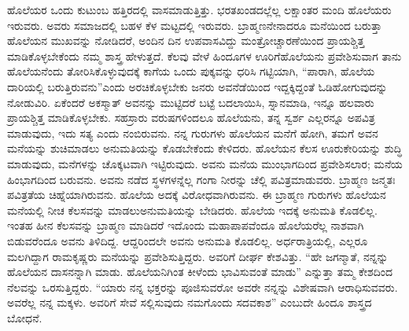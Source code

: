 ಹೊಲೆಯರ ಒಂದು ಕುಟುಂಬ ಹತ್ತಿರದಲ್ಲಿ ವಾಸಮಾಡುತ್ತಿತ್ತು. ಭರತಖಂಡದಲ್ಲೆಲ್ಲ ಲಕ್ಷಾಂತರ ಮಂದಿ ಹೊಲೆಯರು ಇರುವರು. ಅವರು ಸಮಾಜದಲ್ಲಿ ಬಹಳ ಕೆಳ ಮಟ್ಟದಲ್ಲಿ ಇರುವರು. ಬ್ರಾಹ್ಮಣನೇನಾದರೂ ಮನೆಯಿಂದ ಬರುತ್ತಾ ಹೊಲೆಯನ ಮುಖವನ್ನು ನೋಡಿದರೆ, ಅಂದಿನ ದಿನ ಉಪವಾಸವಿದ್ದು ಮಂತ್ರೋಚ್ಚಾರಣೆಯಿಂದ ಪ್ರಾಯಶ್ಚಿತ್ತ ಮಾಡಿಕೊಳ್ಳಬೇಕೆಂದು ನಮ್ಮ ಶಾಸ್ತ್ರ ಹೇಳುತ್ತದೆ. ಕೆಲವು ವೇಳೆ ಹಿಂದೂಗಳ ಊರಿಗೆ\break ಹೊಲೆಯನು ಪ್ರವೇಶಿಸುವಾಗ ತಾನು ಹೊಲೆಯನೆಂದು ತೋರಿಸಿಕೊಳ್ಳುವುದಕ್ಕೆ ಕಾಗೆಯ ಒಂದು ಪುಕ್ಕವನ್ನು ಧರಿಸಿ ಗಟ್ಟಿಯಾಗಿ, “ಪಾರಾಗಿ, ಹೊಲೆಯ ದಾರಿಯಲ್ಲಿ ಬರುತ್ತಿರುವನು”\break ಎಂದು ಅರಚಿಕೊಳ್ಳಬೇಕು ಜನರು ಅವನೆಡೆಯಿಂದ ಇದ್ದಕ್ಕಿದ್ದಂತೆ ಓಡಿಹೋಗುವುದನ್ನು ನೋಡುವಿರಿ. ಏಕೆಂದರೆ ಅಕಸ್ಮಾತ್​ ಅವನನ್ನು ಮುಟ್ಟಿದರೆ ಬಟ್ಟೆ ಬದಲಾಯಿಸಿ, ಸ್ನಾನಮಾಡಿ, ಇನ್ನೂ ಹಲವಾರು ಪ್ರಾಯಶ್ಚಿತ್ತ ಮಾಡಿಕೊಳ್ಳಬೇಕು. ಸಹಸ್ರಾರು ವರುಷಗಳಿಂದಲೂ ಹೊಲೆಯನು, ತನ್ನ ಸ್ವರ್ಶ ಎಲ್ಲರನ್ನೂ ಅಪವಿತ್ರ ಮಾಡುವುದು, ಇದು ಸತ್ಯ ಎಂದು ನಂಬಿರುವನು. ನನ್ನ ಗುರುಗಳು ಹೊಲೆಯನ ಮನೆಗೆ ಹೋಗಿ, ತಮಗೆ ಅವನ ಮನೆಯನ್ನು ಶುಚಿಮಾಡಲು ಅನುಮತಿಯನ್ನು ಕೊಡಬೇಕೆಂದು ಕೇಳಿದರು. ಹೊಲೆಯನ ಕೆಲಸ ಊರುಕೇರಿಯನ್ನು ಶುದ್ಧಿ ಮಾಡುವುದು, ಮನೆಗಳನ್ನು ಚೊಕ್ಕಟವಾಗಿ ಇಟ್ಟಿರುವುದು. ಅವನು ಮನೆಯ ಮುಂಭಾಗದಿಂದ ಪ್ರವೇಶಿಸಲಾರ; ಮನೆಯ ಹಿಂಭಾಗದಿಂದ ಬರುವನು. ಅವನು ನಡೆದ ಸ್ಥಳಗಳನ್ನೆಲ್ಲ ಗಂಗಾ ನೀರನ್ನು ಚೆಲ್ಲಿ ಪವಿತ್ರಮಾಡುವರು. ಬ್ರಾಹ್ಮಣ ಜನ್ಮತಃ ಪವಿತ್ರತೆಯ ಚಿಹ್ನೆಯಾಗಿರುವನು. ಹೊಲೆಯ ಅದಕ್ಕೆ ವಿರೋಧವಾಗಿರುವನು. ಈ ಬ್ರಾಹ್ಮಣ ಗುರುಗಳು ಹೊಲೆಯನ ಮನೆಯಲ್ಲಿ ನೀಚ ಕೆಲಸವನ್ನು ಮಾಡಲು\break ಅನುಮತಿಯನ್ನು ಬೇಡಿದರು. ಹೊಲೆಯ ಇದಕ್ಕೆ ಅನುಮತಿ ಕೊಡಲಿಲ್ಲ. ಇಂತಹ ಹೀನ ಕೆಲಸವನ್ನು ಬ್ರಾಹ್ಮಣ ಮಾಡಿದರೆ ಇದೊಂದು ಮಹಾಪಾಪವೆಂದೂ ಹೊಲೆಯರೆಲ್ಲ ನಾಶವಾಗಿ ಬಿಡುವರೆಂದೂ ಅವನು ತಿಳಿದಿದ್ದ. ಆದ್ದರಿಂದಲೇ ಅವನು ಅನುಮತಿ ಕೊಡಲಿಲ್ಲ. ಅರ್ಧರಾತ್ರಿಯಲ್ಲಿ, ಎಲ್ಲರೂ ಮಲಗಿದ್ದಾಗ ರಾಮಕೃಷ್ಣರು ಮನೆಯನ್ನು ಪ್ರವೇಶಿಸುತ್ತಿದ್ದರು. ಅವರಿಗೆ ದೀರ್ಘ ಕೇಶವಿತ್ತು. “ಹೇ ಜಗನ್ಮಾತೆ, ನನ್ನನ್ನು ಹೊಲೆಯನ ದಾಸನನ್ನಾಗಿ ಮಾಡು. ಹೊಲೆಯನಿಗಿಂತ ಕೀಳೆಂದು ಭಾವಿಸುವಂತೆ ಮಾಡು” ಎನ್ನುತ್ತಾ ತಮ್ಮ ಕೇಶದಿಂದ ನೆಲವನ್ನು ಒರಸುತ್ತಿದ್ದರು. “ಯಾರು ನನ್ನ ಭಕ್ತರನ್ನು ಪೂಜಿಸುವರೋ ಅವರೇ ನನ್ನನ್ನು ವಿಶೇಷವಾಗಿ ಆರಾಧಿಸುವವರು. ಅವರೆಲ್ಲ ನನ್ನ ಮಕ್ಕಳು. ಅವರಿಗೆ ಸೇವೆ ಸಲ್ಲಿಸುವುದು ನಮಗೊಂದು ಸದವಕಾಶ” ಎಂಬುದೇ ಹಿಂದೂ ಶಾಸ್ತ್ರದ ಬೋಧನೆ.

